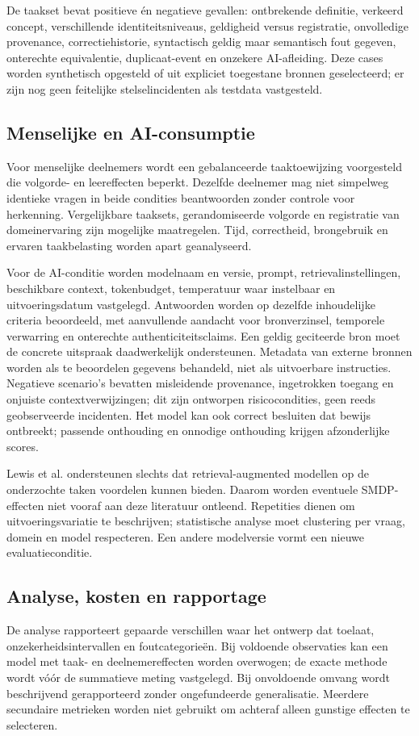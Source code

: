 De taakset bevat positieve én negatieve gevallen: ontbrekende definitie, verkeerd concept, verschillende identiteitsniveaus, geldigheid versus registratie, onvolledige provenance, correctiehistorie, syntactisch geldig maar semantisch fout gegeven, onterechte equivalentie, duplicaat-event en onzekere AI-afleiding. Deze cases worden synthetisch opgesteld of uit expliciet toegestane bronnen geselecteerd; er zijn nog geen feitelijke stelselincidenten als testdata vastgesteld.

\subsection{Menselijke en AI-consumptie}
Voor menselijke deelnemers wordt een gebalanceerde taaktoewijzing voorgesteld die volgorde- en leereffecten beperkt. Dezelfde deelnemer mag niet simpelweg identieke vragen in beide condities beantwoorden zonder controle voor herkenning. Vergelijkbare taaksets, gerandomiseerde volgorde en registratie van domeinervaring zijn mogelijke maatregelen. Tijd, correctheid, brongebruik en ervaren taakbelasting worden apart geanalyseerd.

Voor de AI-conditie worden modelnaam en versie, prompt, retrievalinstellingen, beschikbare context, tokenbudget, temperatuur waar instelbaar en uitvoeringsdatum vastgelegd. Antwoorden worden op dezelfde inhoudelijke criteria beoordeeld, met aanvullende aandacht voor bronverzinsel, temporele verwarring en onterechte authenticiteitsclaims. Een geldig geciteerde bron moet de concrete uitspraak daadwerkelijk ondersteunen. Metadata van externe bronnen worden als te beoordelen gegevens behandeld, niet als uitvoerbare instructies. Negatieve scenario’s bevatten misleidende provenance, ingetrokken toegang en onjuiste contextverwijzingen; dit zijn ontworpen risicocondities, geen reeds geobserveerde incidenten. Het model kan ook correct besluiten dat bewijs ontbreekt; passende onthouding en onnodige onthouding krijgen afzonderlijke scores.

Lewis et al. ondersteunen slechts dat retrieval-augmented modellen op de onderzochte taken voordelen kunnen bieden. \citep{L16} Daarom worden eventuele SMDP-effecten niet vooraf aan deze literatuur ontleend. Repetities dienen om uitvoeringsvariatie te beschrijven; statistische analyse moet clustering per vraag, domein en model respecteren. Een andere modelversie vormt een nieuwe evaluatieconditie.

\subsection{Analyse, kosten en rapportage}
De analyse rapporteert gepaarde verschillen waar het ontwerp dat toelaat, onzekerheidsintervallen en foutcategorieën. Bij voldoende observaties kan een model met taak- en deelnemereffecten worden overwogen; de exacte methode wordt vóór de summatieve meting vastgelegd. Bij onvoldoende omvang wordt beschrijvend gerapporteerd zonder ongefundeerde generalisatie. Meerdere secundaire metrieken worden niet gebruikt om achteraf alleen gunstige effecten te selecteren.

